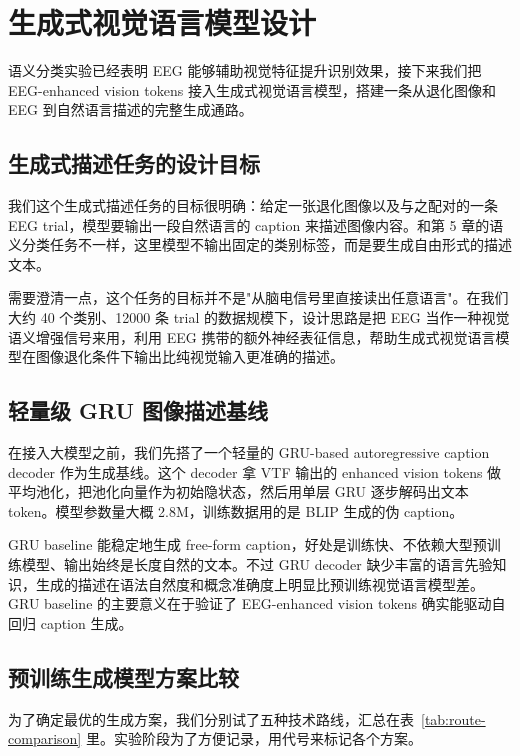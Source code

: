 \section{生成式视觉语言模型设计}

语义分类实验已经表明 EEG 能够辅助视觉特征提升识别效果，接下来我们把 EEG-enhanced vision tokens 接入生成式视觉语言模型，搭建一条从退化图像和 EEG 到自然语言描述的完整生成通路。

\subsection{生成式描述任务的设计目标}

我们这个生成式描述任务的目标很明确：给定一张退化图像以及与之配对的一条 EEG trial，模型要输出一段自然语言的 caption 来描述图像内容。和第 5 章的语义分类任务不一样，这里模型不输出固定的类别标签，而是要生成自由形式的描述文本。

需要澄清一点，这个任务的目标并不是"从脑电信号里直接读出任意语言"。在我们大约 40 个类别、12000 条 trial 的数据规模下，设计思路是把 EEG 当作一种视觉语义增强信号来用，利用 EEG 携带的额外神经表征信息，帮助生成式视觉语言模型在图像退化条件下输出比纯视觉输入更准确的描述。

\subsection{轻量级 GRU 图像描述基线}

在接入大模型之前，我们先搭了一个轻量的 GRU-based autoregressive caption decoder 作为生成基线。这个 decoder 拿 VTF 输出的 enhanced vision tokens 做平均池化，把池化向量作为初始隐状态，然后用单层 GRU 逐步解码出文本 token。模型参数量大概 2.8M，训练数据用的是 BLIP 生成的伪 caption。

GRU baseline 能稳定地生成 free-form caption，好处是训练快、不依赖大型预训练模型、输出始终是长度自然的文本。不过 GRU decoder 缺少丰富的语言先验知识，生成的描述在语法自然度和概念准确度上明显比预训练视觉语言模型差。GRU baseline 的主要意义在于验证了 EEG-enhanced vision tokens 确实能驱动自回归 caption 生成。

\subsection{预训练生成模型方案比较}

为了确定最优的生成方案，我们分别试了五种技术路线，汇总在表~\ref{tab:route-comparison} 里。实验阶段为了方便记录，用代号来标记各个方案。

